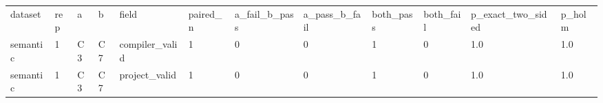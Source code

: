 \begin{tabular}{llllllllllll}
dataset & rep & a & b & field & paired\_n & a\_fail\_b\_pass & a\_pass\_b\_fail & both\_pass & both\_fail & p\_exact\_two\_sided & p\_holm \\
semantic & 1 & C3 & C7 & compiler\_valid & 1 & 0 & 0 & 1 & 0 & 1.0 & 1.0 \\
semantic & 1 & C3 & C7 & project\_valid & 1 & 0 & 0 & 1 & 0 & 1.0 & 1.0 \\
\end{tabular}